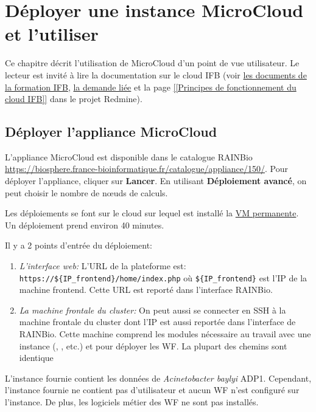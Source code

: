 \chapter{Déployer une instance MicroCloud et l'utiliser} \label{chap:deploiement}

Ce chapitre décrit l'utilisation de MicroCloud d'un point de vue utilisateur.
Le lecteur est invité à lire la documentation sur le cloud IFB
(voir \href{https://intranet.genoscope.cns.fr/agc/redmine/documents/86}{les documents de la formation IFB},
\href{https://intranet.genoscope.cns.fr/agc/redmine/issues/6010}{la demande liée}
et la page \href{https://intranet.genoscope.cns.fr/agc/redmine/projects/microcloud/wiki/Principes_de_fonctionnement_du_cloud_IFB}{[[Principes de fonctionnement du cloud IFB]]}
dans le projet Redmine).

\section{Déployer l'appliance MicroCloud}

L'appliance MicroCloud est disponible dans le catalogue RAINBio \url{https://biosphere.france-bioinformatique.fr/catalogue/appliance/150/}.
Pour déployer l'appliance, cliquer sur \textbf{Lancer}.
En utilisant \textbf{Déploiement avancé}, on peut choisir le nombre de nœuds de calculs.

Les déploiements se font sur le cloud  sur lequel est installé la \hyperref[VM permanente]{VM permanente}.
Un déploiement prend environ 40 minutes.

Il y a 2 points d'entrée du déploiement:
\begin{enumerate}
	\item \emph{L'interface web:} L'URL de la plateforme est: \nolinkurl{https://${IP_frontend}/home/index.php} où \nolinkurl{${IP_frontend}}
	      est l'IP de la machine frontend.
	      Cette URL est reporté dans l'interface RAINBio.
	\item \emph{La machine frontale du cluster:} On peut aussi se connecter en SSH à la machine frontale du cluster
	      dont l'IP est aussi reportée dans l'interface de RAINBio.
	      Cette machine comprend les modules nécessaire au travail avec une instance (, , etc.)
	      et  pour déployer les WF.
	      La plupart des chemins sont identique
\end{enumerate}
L'instance fournie contient les données de \textit{Acinetobacter baylyi} ADP1.
Cependant, l'instance fournie ne contient pas d'utilisateur
et aucun WF n'est configuré sur l'instance.
De plus, les logiciels métier des WF ne sont pas installés.


